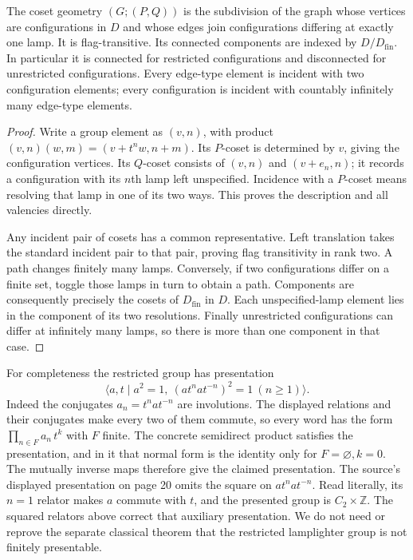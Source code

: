\begin{proposition}\label{prop:lamps}
The coset geometry $(G;(P,Q))$ is the subdivision of the graph whose
vertices are configurations in $D$ and whose edges join configurations
differing at exactly one lamp. It is flag-transitive. Its connected
components are indexed by $D/D_{\mathrm{fin}}$. In particular it is
connected for restricted configurations and disconnected for unrestricted
configurations. Every edge-type element is incident with two configuration
elements; every configuration is incident with countably infinitely many
edge-type elements.
\end{proposition}
\begin{proof}
Write a group element as $(v,n)$, with product
$(v,n)(w,m)=(v+t^nw,n+m)$. Its $P$-coset is determined by $v$,
giving the configuration vertices. Its $Q$-coset consists of
$(v,n)$ and $(v+e_n,n)$; it records a configuration with its $n$th
lamp left unspecified. Incidence with a $P$-coset means resolving
that lamp in one of its two ways. This proves the description and all
valencies directly.

Any incident pair of cosets has a common representative. Left
translation takes the standard incident pair to that pair, proving
flag transitivity in rank two. A path changes finitely many lamps.
Conversely, if two configurations differ on a finite set, toggle those
lamps in turn to obtain a path. Components are consequently precisely
the cosets of $D_{\mathrm{fin}}$ in $D$. Each unspecified-lamp element
lies in the component of its two resolutions. Finally unrestricted
configurations can differ at infinitely many lamps, so there is more
than one component in that case.
\end{proof}

For completeness the restricted group has presentation
\[
 \langle a,t\mid a^2=1,\ (a t^n a t^{-n})^2=1\ (n\geq1)\rangle.
\]
Indeed the conjugates $a_n=t^nat^{-n}$ are involutions. The displayed
relations and their conjugates make every two of them commute, so
every word has the form $\prod_{n\in F}a_n\,t^k$ with $F$ finite.
The concrete semidirect product satisfies the presentation, and in it
that normal form is the identity only for $F=\varnothing,k=0$.
The mutually inverse maps therefore give the claimed presentation.
The source's displayed presentation on page 20 omits the square on
$a t^n a t^{-n}$. Read literally, its $n=1$ relator makes $a$ commute
with $t$, and the presented group is $C_2\times\mathbb Z$.
The squared relators above correct that auxiliary presentation.
We do not need or reprove the separate classical theorem that the
restricted lamplighter group is not finitely presentable.

